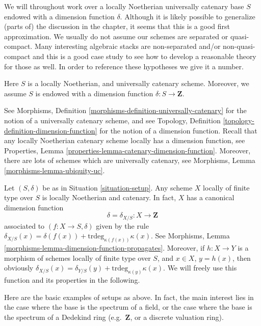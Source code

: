 \noindent
We will throughout work over a locally Noetherian universally
catenary base $S$ endowed with a dimension function $\delta$.
Although it is likely possible to generalize (parts of) the
discussion in the chapter, it seems that this is a good first
approximation. We usually do not assume our schemes are
separated or quasi-compact. Many interesting algebraic stacks
are non-separated and/or non-quasi-compact and this is a good
case study to see how to develop a reasonable theory for those as well.
In order to reference these hypotheses we give it a number.

\begin{situation}
\label{situation-setup}
Here $S$ is a locally Noetherian, and universally catenary scheme.
Moreover, we assume $S$ is endowed with a dimension function
$\delta : S \longrightarrow \mathbf{Z}$.
\end{situation}

\noindent
See Morphisms, Definition \ref{morphisms-definition-universally-catenary}
for the notion of a universally catenary scheme, and see
Topology, Definition \ref{topology-definition-dimension-function}
for the notion of a dimension function. Recall that any locally
Noetherian catenary scheme locally has a dimension function, see
Properties, Lemma \ref{properties-lemma-catenary-dimension-function}.
Moreover, there are lots of schemes which are universally catenary,
see Morphisms, Lemma \ref{morphisms-lemma-ubiquity-uc}.

\medskip\noindent
Let $(S, \delta)$ be as in Situation \ref{situation-setup}.
Any scheme $X$ locally of finite type over $S$ is locally Noetherian
and catenary. In fact, $X$ has a canonical dimension function
$$
\delta = \delta_{X/S} : X \longrightarrow \mathbf{Z}
$$
associated to $(f : X \to S, \delta)$ given by the rule
$\delta_{X/S}(x) = \delta(f(x)) + \text{trdeg}_{\kappa(f(x))}\kappa(x)$.
See Morphisms, Lemma \ref{morphisms-lemma-dimension-function-propagates}.
Moreover, if $h : X \to Y$ is a morphism of schemes locally of finite
type over $S$, and $x \in X$, $y = h(x)$,
then obviously
$\delta_{X/S}(x) = \delta_{Y/S}(y) + \text{trdeg}_{\kappa(y)}\kappa(x)$.
We will freely use this function and its properties in the following.

\medskip\noindent
Here are the basic examples of setups as above.
In fact, the main interest lies in the case where the base
is the spectrum of a field, or the case where the base
is the spectrum of a Dedekind ring (e.g.\ $\mathbf{Z}$,
or a discrete valuation ring).

